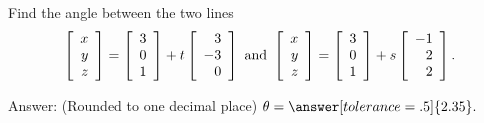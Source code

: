 \documentclass{ximera}
\begin{document}
\begin{problem}
  Find the angle between the two lines
  \begin{equation*}
    \startmat{r} x \\ y \\ z \stopmat
    = \startmat{r} 3 \\ 0 \\ 1 \stopmat
    + t \startmat{r} 3 \\ -3 \\ 0 \stopmat
    \quad\mbox{and}\quad
    \startmat{r} x \\ y \\ z \stopmat
    = \startmat{r} 3 \\ 0 \\ 1 \stopmat
    + s \startmat{r} -1 \\ 2 \\ 2 \stopmat.
  \end{equation*}

  Answer: (Rounded to one decimal place) $\theta=\answer[tolerance=.5]{2.35}.$
\end{problem}
\end{document}
